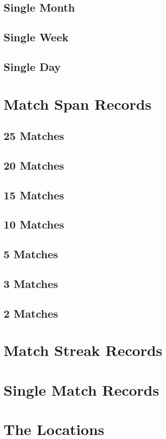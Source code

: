 \documentclass[a4paper,twoside,titlepage]{book}
\begin{document}
      \section{Single Month}
      \section{Single Week}
      \section{Single Day}
    \chapter{Match Span Records}
      \section{25 Matches}
      \section{20 Matches}
      \section{15 Matches}
      \section{10 Matches}
      \section{5 Matches}
      \section{3 Matches}
      \section{2 Matches}
    \chapter{Match Streak Records}
    \chapter{Single Match Records}
    \chapter{The Locations}
\end{document}
